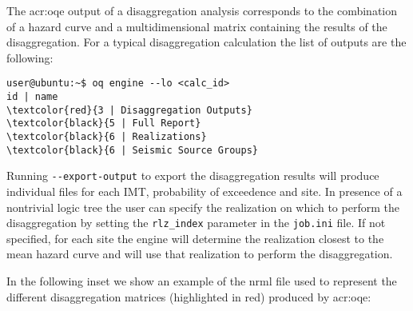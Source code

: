 The \glsdesc{acr:oqe} output of a disaggregation analysis corresponds to the
combination of a hazard curve and a multidimensional matrix containing the
results of the disaggregation. For a typical disaggregation calculation the
list of outputs are the following:

\begin{Verbatim}[frame=single, commandchars=\\\{\}, fontsize=\small]
user@ubuntu:~$ oq engine --lo <calc_id>
id | name
\textcolor{red}{3 | Disaggregation Outputs}
\textcolor{black}{5 | Full Report}
\textcolor{black}{6 | Realizations}
\textcolor{black}{6 | Seismic Source Groups}
\end{Verbatim}
%

Running \texttt{-{}-export-output} to export the disaggregation results will produce individual files for each IMT, probability of exceedence and site.
In presence of a nontrivial logic tree the user can specify the realization
on which to perform the disaggregation by setting the \texttt{rlz\_index}
parameter in the \texttt{job.ini} file. If not specified, for each site
the engine will determine the realization closest to the mean hazard curve
and will use that realization to perform the disaggregation.

In the following inset we show an example of the nrml file used to represent the different disaggregation matrices (highlighted in red) produced by
\gls{acr:oqe}:


